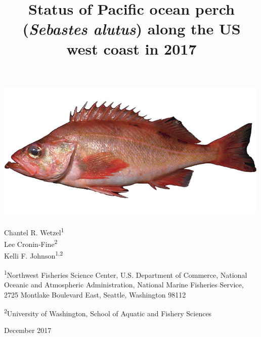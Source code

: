 \documentclass[12pt,]{article}
\title{Status of Pacific ocean perch (\emph{Sebastes alutus}) along the US west
coast in 2017}
\author{}
\date{}
\begin{document}
\maketitle


\begin{center}
\thispagestyle{empty}


\vspace{.5cm}

\includegraphics{Sebastes_alutus}~\\[0.5cm]



Chantel R. Wetzel\textsuperscript{1}\\
Lee Cronin-Fine\textsuperscript{2}\\
Kelli F. Johnson\textsuperscript{1,2}\\

\vspace{.5cm}

\small
\textsuperscript{1}Northwest Fisheries Science Center, U.S. Department of Commerce, National Oceanic and Atmospheric Administration, National Marine Fisheries Service, 2725 Montlake Boulevard East, Seattle, Washington 98112\\

\vspace{.3cm}

\textsuperscript{2}University of Washington, School of Aquatic and Fishery Sciences\\





\vspace{1cm}

\vfill
December 2017


\vspace{.3cm}


\end{center}
\end{document}
